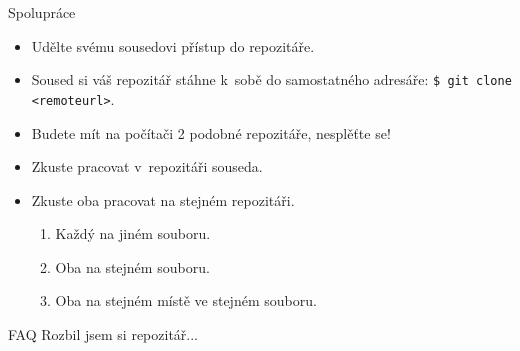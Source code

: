 \documentclass[
]{beamer}
\begin{document}
\begin{frame}{Spolupráce}
\begin{itemize}
	\item Udělte svému sousedovi přístup do repozitáře.
	\item Soused si váš repozitář stáhne k sobě do samostatného adresáře: \texttt{\$ git clone <remoteurl>}.
	\item Budete mít na počítači 2 podobné repozitáře, nesplěťte se!
	\item Zkuste pracovat v repozitáři souseda.
	\item Zkuste oba pracovat na stejném repozitáři.
	\begin{enumerate}
		\item Každý na jiném souboru.
		\item Oba na stejném souboru.
		\item Oba na stejném místě ve stejném souboru.
	\end{enumerate}
\end{itemize}
\end{frame}

\begin{frame}{FAQ}
Rozbil jsem si repozitář...
\end{frame}
\end{document}
